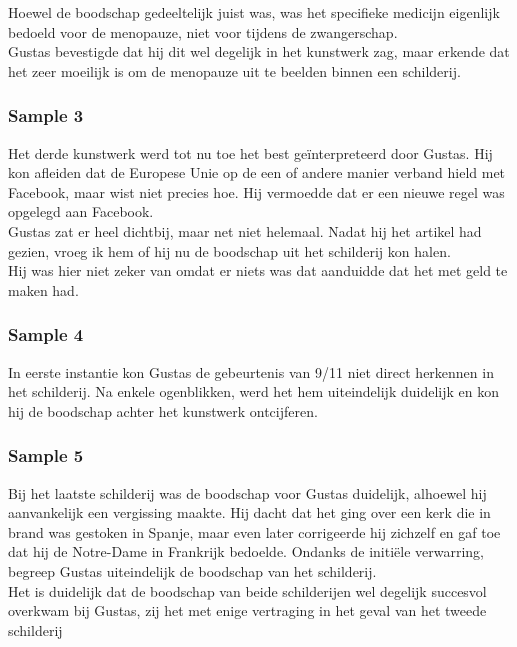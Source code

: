 Hoewel de boodschap gedeeltelijk juist was, was het specifieke medicijn eigenlijk bedoeld voor de menopauze, niet voor tijdens de zwangerschap. \\

Gustas bevestigde dat hij dit wel degelijk in het kunstwerk zag, maar erkende dat het zeer moeilijk is om de menopauze uit te beelden binnen een schilderij.

\subsubsection{Sample 3}
Het derde kunstwerk werd tot nu toe het best geïnterpreteerd door Gustas. Hij kon afleiden dat de Europese Unie op de een of andere manier verband hield met Facebook, maar wist niet precies hoe. Hij vermoedde dat er een nieuwe regel was opgelegd aan Facebook. \\

Gustas zat er heel dichtbij, maar net niet helemaal. Nadat hij het artikel had gezien, vroeg ik hem of hij nu de boodschap uit het schilderij kon halen. \\

Hij was hier niet zeker van omdat er niets was dat aanduidde dat het met geld te maken had.

\subsubsection{Sample 4}
In eerste instantie kon Gustas de gebeurtenis van 9/11 niet direct herkennen in het schilderij. Na enkele ogenblikken, werd het hem uiteindelijk duidelijk en kon hij de boodschap achter het kunstwerk ontcijferen.

\subsubsection{Sample 5}
Bij het laatste schilderij was de boodschap voor Gustas duidelijk, alhoewel hij aanvankelijk een vergissing maakte. Hij dacht dat het ging over een kerk die in brand was gestoken in Spanje, maar even later corrigeerde hij zichzelf en gaf toe dat hij de Notre-Dame in Frankrijk bedoelde. Ondanks de initiële verwarring, begreep Gustas uiteindelijk de boodschap van het schilderij. \\

Het is duidelijk dat de boodschap van beide schilderijen wel degelijk succesvol overkwam bij Gustas, zij het met enige vertraging in het geval van het tweede schilderij

